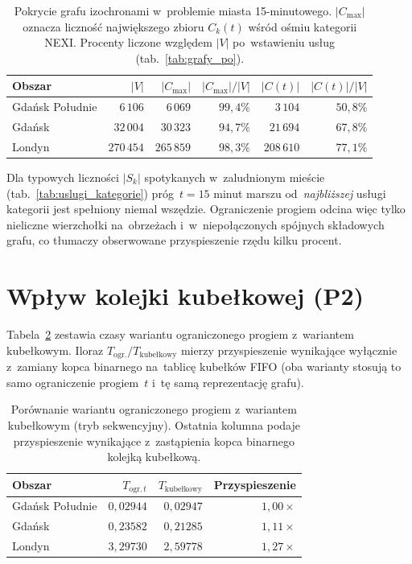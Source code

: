 \begin{table}[H]
\centering
\caption{Pokrycie grafu izochronami w~problemie miasta 15-minutowego.
$|C_{\max}|$ oznacza liczność największego zbioru $C_k(t)$ wśród ośmiu
kategorii NEXI. Procenty liczone względem $|V|$ po~wstawieniu usług
(tab.~\ref{tab:grafy_po}).}
\label{tab:wyniki:pokrycie}
\begin{tabular}{l r r r r r}
\hline
\textbf{Obszar} & $|V|$ & $|C_{\max}|$ & $|C_{\max}|/|V|$
& $|C(t)|$ & $|C(t)|/|V|$ \\
\hline
Gdańsk Południe & $6\,106$   & $6\,069$   & $99{,}4\%$ & $3\,104$   & $50{,}8\%$ \\
Gdańsk          & $32\,004$  & $30\,323$  & $94{,}7\%$ & $21\,694$  & $67{,}8\%$ \\
Londyn          & $270\,454$ & $265\,859$ & $98{,}3\%$ & $208\,610$ & $77{,}1\%$ \\
\hline
\end{tabular}
\end{table}

\clearpage

Dla typowych liczności $|S_k|$
spotykanych w~zaludnionym mieście (tab.~\ref{tab:uslugi_kategorie}) próg~$t=15$
minut marszu od~\emph{najbliższej} usługi kategorii jest spełniony niemal
wszędzie. Ograniczenie progiem odcina więc tylko nieliczne wierzchołki na~obrzeżach
i~w~niepołączonych spójnych składowych grafu, co tłumaczy obserwowane
przyspieszenie rzędu kilku procent.

\section{Wpływ kolejki kubełkowej (P2)}
\label{sec:wyniki:p2}

Tabela~\ref{tab:wyniki:p2} zestawia czasy wariantu ograniczonego progiem
z~wariantem kubełkowym. Iloraz $T_{\text{ogr.}}/T_{\text{kubełkowy}}$ mierzy
przyspieszenie wynikające wyłącznie z~zamiany kopca binarnego na~tablicę
kubełków FIFO (oba warianty stosują to samo ograniczenie progiem~$t$
i~tę samą reprezentację grafu).

\begin{table}[H]
\centering
\caption{Porównanie wariantu ograniczonego progiem z~wariantem kubełkowym
(tryb sekwencyjny). Ostatnia kolumna podaje przyspieszenie wynikające
z~zastąpienia kopca binarnego kolejką kubełkową.}
\label{tab:wyniki:p2}
\begin{tabular}{l r r r}
\hline
\textbf{Obszar} & $T_{\text{ogr.}\,t}$ & $T_{\text{kubełkowy}}$
& \textbf{Przyspieszenie} \\
\hline
Gdańsk Południe & $0{,}02944$ & $0{,}02947$ & $1{,}00\times$ \\
Gdańsk          & $0{,}23582$ & $0{,}21285$ & $1{,}11\times$ \\
Londyn          & $3{,}29730$ & $2{,}59778$ & $1{,}27\times$ \\
\hline
\end{tabular}
\end{table}

